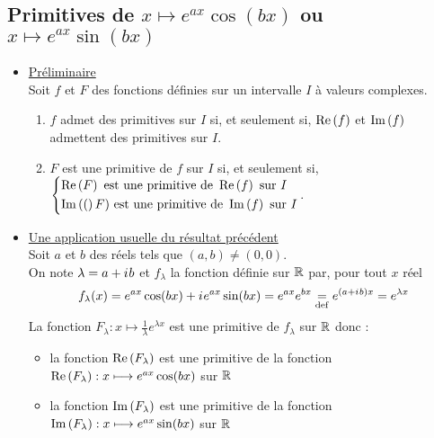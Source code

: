\subsection{Primitives de \(x \mapsto e^{ax} \cos(bx)\) ou \(x \mapsto e^{ax} \sin(bx)\)}
\begin{defprop}[]
    \begin{itemize}
        \item \underline{Préliminaire} \\
        Soit \(f\) et \(F\) des fonctions définies sur un intervalle \(I\) à valeurs complexes.
        \begin{enumerate}
            \item \(f\) admet des primitives sur \(I\) si, et seulement si, \(\operatorname{Re}\left(f\right)\) et \(\operatorname{Im}\left(f\right)\) admettent des primitives sur \(I\).
            \item \(F\) est une primitive de \(f\) sur \(I\) si, et seulement si, 
            \(\begin{cases*}
                \Reel{F}\text{ est une primitive de } \Reel{f}\text{ sur  } I \\
                \Ima(F) \text{ est une primitive de } \Ima{f} \text{ sur } I
            \end{cases*}\).
        \end{enumerate}
        \item \underline{Une application usuelle du résultat précédent} \\
        Soit \(a\) et \(b\) des réels tels que \((a,b) \neq (0,0)\). \\
        On note \(\lambda = a+i\mkern1mu b\) et \(f_{\lambda}\) la fonction définie sur \(\mathbb{R}\) par, pour tout \(x\) réel 
            \[f_{\lambda}(x) = e^{ax}\cos(bx) + i\mkern1mu e^{ax}\sin(bx) = e^{ax}e^{bx} \underset{\mathrm{def}}{=} e^{(a+i\mkern1mu b)x} = e^{\lambda x}\]
        La fonction \(F_{\lambda}:x\mapsto \frac{1}{\lambda} e^{\lambda x}\) est une primitive de \(f_{\lambda}\) sur \(\mathbb{R}\) donc :
        \begin{itemize}
            \item la fonction \(\operatorname{Re}\left(F_{\lambda}\right)\) est une primitive de la fonction \(\operatorname{Re}\left(F_{\lambda}\right):x\longmapsto e^{ax}\cos(bx)\) sur \(\mathbb{R}\)
            \item la fonction \(\operatorname{Im}\left(F_{\lambda}\right)\) est une primitive de la fonction \(\operatorname{Im}\left(F_{\lambda}\right): x\longmapsto e^{ax}\sin(bx)\) sur \(\mathbb{R}\)
        \end{itemize}
    \end{itemize}
\end{defprop}

